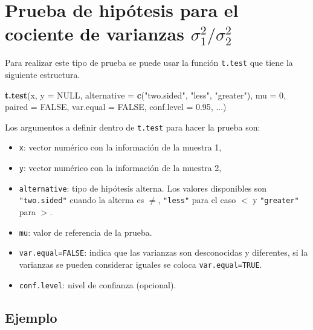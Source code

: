 \documentclass[10pt,]{krantz}
\makeatletter
\newenvironment{Shaded}{\begin{snugshade}}{\end{snugshade}}
\newcommand{\KeywordTok}[1]{\textcolor[rgb]{0.13,0.29,0.53}{\textbf{{#1}}}}
\newcommand{\DataTypeTok}[1]{\textcolor[rgb]{0.13,0.29,0.53}{{#1}}}
\newcommand{\DecValTok}[1]{\textcolor[rgb]{0.00,0.00,0.81}{{#1}}}
\newcommand{\FloatTok}[1]{\textcolor[rgb]{0.00,0.00,0.81}{{#1}}}
\newcommand{\StringTok}[1]{\textcolor[rgb]{0.31,0.60,0.02}{{#1}}}
\newcommand{\OtherTok}[1]{\textcolor[rgb]{0.56,0.35,0.01}{{#1}}}
\newcommand{\NormalTok}[1]{{#1}}
\providecommand{\tightlist}{%
  \setlength{\itemsep}{0pt}\setlength{\parskip}{0pt}}
\newenvironment{kframe}{%
\medskip{}
\setlength{\fboxsep}{.8em}
 \def\at@end@of@kframe{}%
 \ifinner\ifhmode%
  \def\at@end@of@kframe{\end{minipage}}%
  \begin{minipage}{\columnwidth}%
 \fi\fi%
 \def\FrameCommand##1{\hskip\@totalleftmargin \hskip-\fboxsep
 \colorbox{shadecolor}{##1}\hskip-\fboxsep
     \hskip-\linewidth \hskip-\@totalleftmargin \hskip\columnwidth}%
 \MakeFramed {\advance\hsize-\width
   \@totalleftmargin\z@ \linewidth\hsize
   \@setminipage}}%
 {\par\unskip\endMakeFramed%
 \at@end@of@kframe}
\renewenvironment{Shaded}{\begin{kframe}}{\end{kframe}}
\makeatother
\begin{document}
\section{\texorpdfstring{Prueba de hipótesis para el cociente de
varianzas
\(\sigma_1^2 / \sigma_2^2\)}{Prueba de hipótesis para el cociente de varianzas \textbackslash{}sigma\_1\^{}2 / \textbackslash{}sigma\_2\^{}2}}\label{prueba-de-hipotesis-para-el-cociente-de-varianzas-sigma_12-sigma_22}

Para realizar este tipo de prueba se puede usar la función
\texttt{t.test} que tiene la siguiente estructura.

\begin{Shaded}
\begin{Highlighting}[]
\KeywordTok{t.test}\NormalTok{(x, }\DataTypeTok{y =} \OtherTok{NULL}\NormalTok{,}
       \DataTypeTok{alternative =} \KeywordTok{c}\NormalTok{(}\StringTok{"two.sided"}\NormalTok{, }\StringTok{"less"}\NormalTok{, }\StringTok{"greater"}\NormalTok{),}
       \DataTypeTok{mu =} \DecValTok{0}\NormalTok{, }\DataTypeTok{paired =} \OtherTok{FALSE}\NormalTok{, }\DataTypeTok{var.equal =} \OtherTok{FALSE}\NormalTok{,}
       \DataTypeTok{conf.level =} \FloatTok{0.95}\NormalTok{, ...)}
\end{Highlighting}
\end{Shaded}

Los argumentos a definir dentro de \texttt{t.test} para hacer la prueba
son:

\begin{itemize}
\tightlist
\item
  \texttt{x}: vector numérico con la información de la muestra 1,
\item
  \texttt{y}: vector numérico con la información de la muestra 2,
\item
  \texttt{alternative}: tipo de hipótesis alterna. Los valores
  disponibles son \texttt{"two.sided"} cuando la alterna es \(\neq\),
  \texttt{"less"} para el caso \(<\) y \texttt{"greater"} para \(>\).
\item
  \texttt{mu}: valor de referencia de la prueba.
\item
  \texttt{var.equal=FALSE}: indica que las varianzas son desconocidas y
  diferentes, si la varianzas se pueden considerar iguales se coloca
  \texttt{var.equal=TRUE}.
\item
  \texttt{conf.level}: nivel de confianza (opcional).
\end{itemize}

\subsection*{Ejemplo}\label{ejemplo-65}
\end{document}
